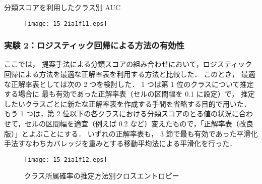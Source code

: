 \documentclass[japanese]{jnlp_1.4}
\begin{document}
\begin{table}[t]
\begin{center}
\caption{分類スコアを利用したクラス別 AUC}
\label{AUC_rank23}

\end{center}
\end{table}
\begin{figure}[t]
  \begin{center}
\texttt{[image: 15-2ia1f11.eps]}
\label{JGSS_train_size}
  \end{center}
\end{figure}



\subsubsection{実験 2：ロジスティック回帰による方法の有効性}

ここでは，
提案手法による分類スコアの組み合わせにおいて，ロジスティック回帰による方法を最適な正解率表を利用する方法と比較した．
このとき，
最適な正解率表としては次の 2 つを検討した．
1 つは第 1 位のクラスについて推定する場合に
最も有効であった正解率表（セルの区間幅を 0.1 に設定）で，
推定したいクラスごとに新たな正解率表を作成する手間を省略する目的で用いた．
もう 1 つは，第 2 位以下の各クラスにおける分類スコアのとる値の状況に合わせて，セルの区間幅を適宜（例えば 0.2 など）変えたもので，「正解率表（改良版）」とよぶことにする．
いずれの正解率表も，
3 節で最も有効であった平滑化手法すなわちカバレッジを重みとする移動平均法による平滑化を行った．



\begin{figure}[b]
\begin{center}
\texttt{[image: 15-2ia1f12.eps]}
\caption{クラス所属確率の推定方法別クロスエントロピー}
\label{JGSS_20ns_seikai_hikaku}
\end{center}
\end{figure}
\end{document}

